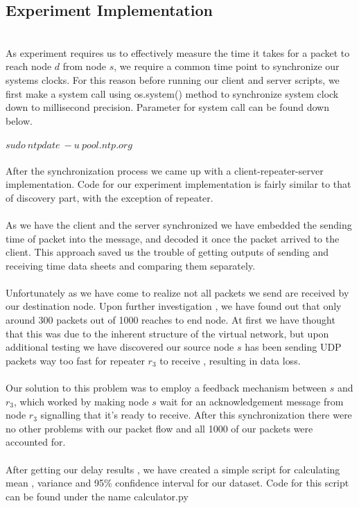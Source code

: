 \documentclass[conference]{IEEEtran}
\begin{document}
\subsection{Experiment Implementation}
\\
As experiment requires us to effectively measure the time it takes for a packet to reach node $d$ from node $s$, we require a common time point to synchronize our systems clocks. For this reason before running our client and server scripts, we first make a system call using os.system() method to synchronize system clock down to millisecond precision. Parameter for system call can be found down below.\\
\\
$sudo \ ntpdate \ -u \ pool.ntp.org $\\
\\
After the synchronization process we came up with a client-repeater-server implementation. Code for our experiment implementation is fairly similar to that of discovery part, with the exception of repeater.\\
\\
As we have the client and the server synchronized we have embedded the sending time of packet into the message, and decoded it once the packet arrived to the client. This approach saved us the trouble of getting outputs of sending and receiving time data sheets and comparing them separately.\\
\\
Unfortunately as we have come to realize not all packets we send are received by our destination node. Upon further investigation , we have found out that only around 300 packets out of 1000 reaches to end node. At first we have thought that this was due to the inherent structure of the virtual network, but upon additional testing we have discovered our source node $s$ has been sending UDP packets way too fast for repeater $r_3$ to receive , resulting in data loss. \\
\\
Our solution to this problem was to employ a feedback mechanism between $s$ and $r_3$, which worked by making node $s$ wait for an acknowledgement message from node $r_3$ signalling that it's ready to receive. After this synchronization there were no other problems with our packet flow and all 1000 of our packets were accounted for. \\
\\
After getting our delay results , we have created a simple script for calculating mean , variance and 95\% confidence interval for our dataset. Code for this script can be found under the name calculator.py
\end{document}
